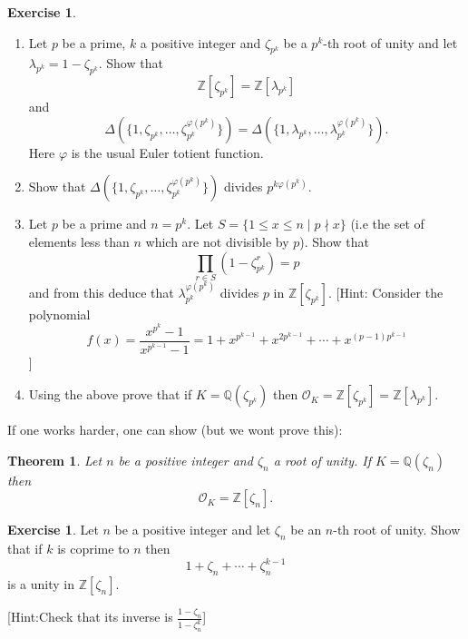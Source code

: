 \documentclass[11pt,a4paper]{report}
\theoremstyle{plain}
\newtheorem{theorem}[subsection]{Theorem}
\theoremstyle{definition}
\theoremstyle{definition}
\newtheorem{question}[subsection]{Exercise}
\newcommand{\ZZ}{\mathbb{Z}}
\def\QQ{\mathbb{Q}}
\def \lam {\lambda}
\def \OO {\mathcal{O}}
\begin{document}
	\begin{question}
		\begin{enumerate}
			\item 	Let $p$ be a prime, $k$ a positive integer and $\zeta_{p^k}$ be a $p^k$-th root of unity and let $\lam_{p^k}=1-\zeta_{p^k}$. Show that \[\ZZ[\zeta_{p^k}]=\ZZ[\lam_{p^k}] \] and \[\Delta(\{1,\zeta_{p^k},\dots,\zeta_{p^k}^{\varphi(p^k)}\})=\Delta(\{1,\lam_{p^k},\dots,\lam_{p^k}^{\varphi(p^k)}\}).\] Here $\varphi$ is the usual Euler totient function.
			
			\item Show that $\Delta(\{1,\zeta_{p^k},\dots,\zeta_{p^k}^{\varphi(p^k)}\})$ divides $p^{k\varphi(p^k)}$.
			
			\item 		Let $p$ be a prime and $n=p^k$. Let $S=\{1 \leq x \leq n \mid p\nmid x\}$ (i.e the set of elements less than $n$ which are not divisible by $p$). Show that \[\prod_{r \in S} (1-\zeta_{p^k}^r)=p\] and from this deduce that $\lam_{p^k}^{\varphi(p^k)}$ divides $p$ in $\ZZ[\zeta_{p^k}]$. [Hint: Consider the polynomial \[f(x)=\frac{x^{p^k}-1}{x^{p^{k-1}}-1}=1+x^{p^{k-1}}+x^{2p^{k-1}}+\cdots+x^{(p-1)p^{k-1}} \]]  
			
			
			
			\item Using the above prove that if $K=\QQ(\zeta_{p^k})$ then $\OO_K=\ZZ[\zeta_{p^k}]=\ZZ[\lam_{p^k}]$.
			
		\end{enumerate}
		
	\end{question}
	
	
	
	If one works harder, one can show (but we wont prove this):
	
	\begin{theorem}\label{thm: ring of ints of cyclo field}
		Let $n$ be a positive integer and $\zeta_n$ a root of unity. If $K=\QQ(\zeta_n)$ then \[\OO_K=\ZZ[\zeta_n].\]
	\end{theorem}
	
	\begin{question}
		Let $n$ be a positive integer and let $\zeta_n$ be an $n$-th root of unity. Show that if $k$ is coprime to $n$ then \[1+\zeta_n+\cdots+\zeta_n^{k-1}\] is a unity in $\ZZ[\zeta_n]$.
		
		[Hint:Check that its inverse is $\frac{1-\zeta_n}{1-\zeta_n^k}$] 
	\end{question}
	
\end{document}
